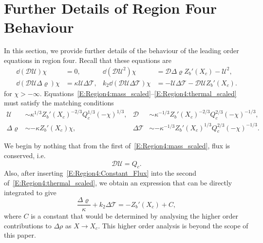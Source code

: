\documentclass{article}
\begin{document}
\section{Further Details of Region Four Behaviour}
\newcommand{\U}{\mathcal{U}}
\newcommand{\D}{\mathcal{D}}
\newcommand{\p}{\Delta \varrho}
\renewcommand{\t}{\Delta \mathcal{T}}
In this section, we provide further details of the behaviour of the leading order equations in region four. Recall that these equations are 
\begin{align}
\dd{(\D\U)}{\chi} &=0, &
\dd{(\D \U^2)}{\chi} &=  \D \p Z_b'(X_c) -\U^2,\label{E:Region4:mass_scaled}\\
\dd{(\D\U\p)}{\chi} &=\kappa  \U\t, &
k_2 \dd{(\D \U \t)}{\chi} &=- \U \t - \D \U Z_b'(X_c).\label{E:Region4:thermal_scaled}
\end{align}
for $ \chi > -\infty$. Equations~\eqref{E:Region4:mass_scaled}--\eqref{E:Region4:thermal_scaled} must satisfy the matching conditions
\begin{align}
\U &\sim \kappa^{1/3}Z_b'(X_c)^{-2/3}Q_c^{1/3} (-\chi)^{1/3}, &  \D &\sim \kappa^{-1/3} Z_b'(X_c)^{-2/3} Q_c^{2/3}(-\chi)^{-1/3}\label{E:Region4:far_field1},\\
\p &\sim - \kappa Z_b'(X_c) \chi, & \t &\sim -\kappa^{-1/3} Z_b'(X_c)^{1/3} Q_c^{2/3}(-\chi)^{-1/3}\label{E:Region4:far_field2}.
\end{align}

We begin by nothing that from the first of~\eqref{E:Region4:mass_scaled}, flux is conserved, i.e.
\begin{equation}\label{E:Region4:Constant_Flux}
    \D \U  = Q_c.
\end{equation}
Also, after inserting~\eqref{E:Region4:Constant_Flux} into the second of~\eqref{E:Region4:thermal_scaled}, we obtain an expression that  can be directly integrated to give
\begin{equation}\label{E:Region4:Linear_p_t}
    \frac{\p}{\kappa} + k_2 \t = -Z_b'(X_c) + C,
\end{equation}
where $C$ is a constant that would be determined by analysing the higher order contributions to $\Delta \rho$ as $X \to X_c$. This higher order analysis is beyond the scope of this paper.
\end{document}
